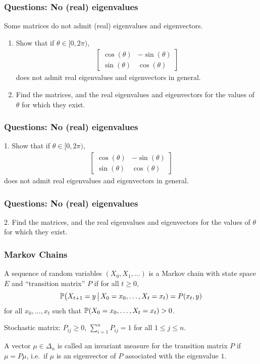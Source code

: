 \documentclass{beamer}
\begin{document}
\begin{frame}[t]
\frametitle{Questions: No (real) eigenvalues}
Some matrices do not admit (real) eigenvalues and eigenvectors. 
\begin{enumerate}
\item Show that if $\theta \in [0,2\pi)$,
\begin{align*}
\begin{bmatrix}
\cos(\theta) & -\sin(\theta) \\
\sin(\theta) & \cos(\theta)
\end{bmatrix}
\end{align*}
does not admit real eigenvalues and eigenvectors in general.
\item Find the matrices, and the real eigenvalues and eigenvectors for the values of $\theta$ for which they exist.
\end{enumerate}
\end{frame}

\begin{frame}[t]
\frametitle{Questions: No (real) eigenvalues}
1. Show that if $\theta \in [0,2\pi)$,
\begin{align*}
\begin{bmatrix}
\cos(\theta) & -\sin(\theta) \\
\sin(\theta) & \cos(\theta)
\end{bmatrix}
\end{align*}
does not admit real eigenvalues and eigenvectors in general.
\pause
\end{frame}

\begin{frame}[t]
\frametitle{Questions: No (real) eigenvalues}
2. Find the matrices, and the real eigenvalues and eigenvectors for the values of $\theta$ for which they exist.
\pause
\end{frame}

\begin{frame}[t]
\frametitle{Markov Chains}
\begin{definition}
	A sequence of random variables $(X_0, X_1, \dots)$ is a Markov chain with state space $E$ and ``transition matrix'' $P$ if for all $t \geq 0$, 
	$$
	\P\big( X_{t+1} = y \, \big| \, X_0= x_0, \dots, X_t = x_t ) = P(x_t,y)
	$$
	for all $x_0, \dots, x_t$ such that $\P(X_0 = x_0, \dots, X_t = x_t) >0$.
\end{definition}
Stochastic matrix: $P_{ij} \geq 0$, $\sum_{i=1}^n P_{ij} = 1$ for all $1 \leq j \leq n$.
\begin{definition}
	A vector $\mu \in \Delta_n$ is called an invariant measure for the transition matrix $P$ if $\mu = P \mu$, i.e.\ if $\mu$ is an eigenvector of $P$ associated with the eigenvalue $1$.
\end{definition}
\end{frame}
\end{document}
